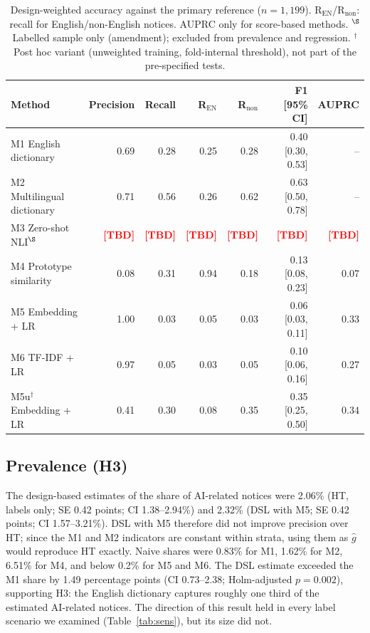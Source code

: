 \documentclass[runningheads]{llncs}
\newcommand{\tbd}{\textcolor{red}{\textbf{[TBD]}}}
\begin{document}
\begin{table}[t]
\caption{Design-weighted accuracy against the primary reference ($n=1{,}199$). R$_\mathrm{EN}$/R$_\mathrm{non}$: recall for English/non-English notices. AUPRC only for score-based methods. $^\S$Labelled sample only (amendment); excluded from prevalence and regression. $^\dagger$Post hoc variant (unweighted training, fold-internal threshold), not part of the pre-specified tests.}\label{tab:acc}
\centering
\begin{tabular}{lrrrrrr}
\toprule
Method & Precision & Recall & R$_\mathrm{EN}$ & R$_\mathrm{non}$ & F1 [95\% CI] & AUPRC \\
\midrule
M1 English dictionary & 0.69 & 0.28 & 0.25 & 0.28 & 0.40 [0.30, 0.53] & -- \\
M2 Multilingual dictionary & 0.71 & 0.56 & 0.26 & 0.62 & 0.63 [0.50, 0.78] & -- \\
M3 Zero-shot NLI$^\S$ & \tbd & \tbd & \tbd & \tbd & \tbd & \tbd \\
M4 Prototype similarity & 0.08 & 0.31 & 0.94 & 0.18 & 0.13 [0.08, 0.23] & 0.07 \\
M5 Embedding + LR & 1.00 & 0.03 & 0.05 & 0.03 & 0.06 [0.03, 0.11] & 0.33 \\
M6 TF-IDF + LR & 0.97 & 0.05 & 0.03 & 0.05 & 0.10 [0.06, 0.16] & 0.27 \\
M5u$^\dagger$ Embedding + LR & 0.41 & 0.30 & 0.08 & 0.35 & 0.35 [0.25, 0.50] & 0.34 \\
\bottomrule
\end{tabular}
\end{table}

\subsection{Prevalence (H3)}
The design-based estimates of the share of AI-related notices were 2.06\% (HT, labels only; SE 0.42 points; CI 1.38--2.94\%) and 2.32\% (DSL with M5; SE 0.42 points; CI 1.57--3.21\%). DSL with M5 therefore did not improve precision over HT; since the M1 and M2 indicators are constant within strata, using them as $\hat{g}$ would reproduce HT exactly. Naive shares were 0.83\% for M1, 1.62\% for M2, 6.51\% for M4, and below 0.2\% for M5 and M6. The DSL estimate exceeded the M1 share by 1.49 percentage points (CI 0.73--2.38; Holm-adjusted $p=0.002$), supporting H3: the English dictionary captures roughly one third of the estimated AI-related notices. The direction of this result held in every label scenario we examined (Table~\ref{tab:sens}), but its size did not.
\end{document}
